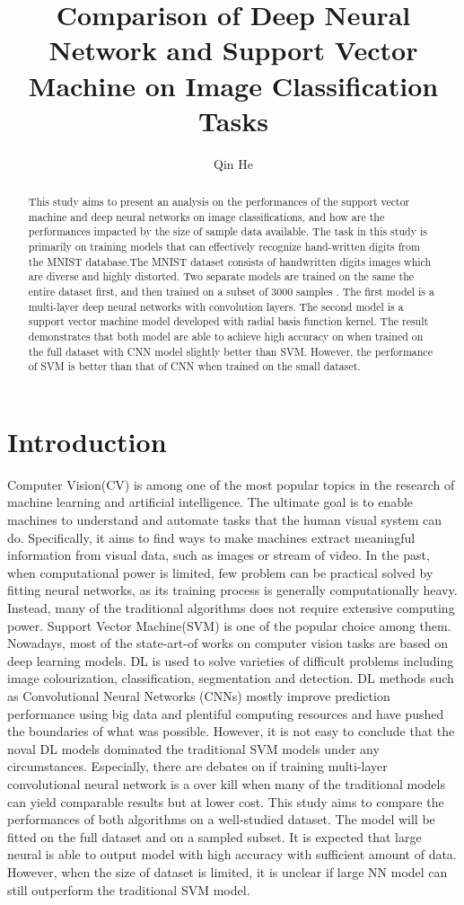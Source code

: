 \documentclass[letterpaper]{article} %
\title{Comparison of Deep Neural Network and Support Vector Machine on Image Classification Tasks }
\author{
    Qin He
}
\begin{document}
\maketitle

\begin{abstract}
This study aims to present an analysis on the performances of the support vector machine and deep neural networks on image classifications, and how are the performances impacted by the size of sample data available. The task in this study is primarily on training models that can effectively  recognize hand-written digits from the MNIST database.The MNIST dataset consists of handwritten digits images which are diverse and highly distorted. Two separate models  are trained on the same the entire dataset first, and then trained on a subset of 3000 samples . The first model is a multi-layer deep neural networks with convolution layers. The second model is a support vector machine model developed with radial basis function kernel. The result demonstrates that both model are able to achieve high accuracy on when trained on the full dataset with CNN model slightly better than SVM. However, the performance of SVM is better than that of CNN when trained on the small dataset.
\end{abstract}

\section{Introduction}
Computer Vision(CV) is among one of the most popular topics in the research of machine learning and artificial intelligence. The ultimate goal is to enable machines to  understand and automate tasks that the human visual system can do. Specifically, it aims to find ways to make machines extract meaningful information from visual data, such as images or stream of video. In the past, when computational power is limited, few problem can be practical solved by fitting neural networks, as its training process is generally computationally heavy. Instead, many of the traditional algorithms does not require extensive computing power. Support Vector Machine(SVM) is one of the popular choice among them. Nowadays, most of the state-art-of works on computer vision tasks are based on deep learning models. DL is used to solve varieties of difficult problems including image colourization, classification, segmentation and detection. DL methods such as Convolutional Neural Networks (CNNs) mostly improve prediction performance using big data and plentiful computing resources and have pushed the boundaries of what was possible. However, it is not easy to conclude that the noval DL models dominated the traditional SVM models under any circumstances. Especially, there are debates on if training multi-layer convolutional neural network is a over kill when many of the traditional models can yield comparable results but at lower cost. This study aims to compare the performances of both algorithms on a well-studied dataset. The model will be fitted on the full dataset and on a sampled subset. It is expected that large neural is able to output model with high accuracy with sufficient amount of data. However, when the size of dataset is limited, it is unclear if large NN model can still outperform the traditional SVM model.
\end{document}
